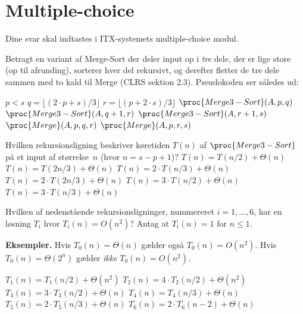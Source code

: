 \section*{Multiple-choice}\label{sec:mc}

Dine svar skal indtastes i ITX-systemets multiple-choice modul.

\multiplechoicestart


Betragt en variant af {\sc Merge-Sort} der deler input op i \emph{tre} dele, der er lige store (op til afrunding), sorterer hver del rekursivt, og derefter fletter de tre dele sammen med to kald til {\sc Merge} (CLRS sektion 2.3). Pseudokoden ser således ud:
\begin{codebox}
  \li \If $p<s$ \Do
  \li $q = \lfloor (2\cdot p+ s)/3\rfloor$
  \li $r = \lfloor (p+2\cdot s)/3\rfloor$
  \li $\proc{Merge3-Sort}(A, p, q)$
  \li $\proc{Merge3-Sort}(A, q+1, r)$
  \li $\proc{Merge3-Sort}(A, r+1, s)$
  \li $\proc{Merge}(A, p, q, r)$
  \li $\proc{Merge}(A, p, r, s)$ \End
\end{codebox}

\noindent
Hvilken rekursionsligning beskriver køretiden $T(n)$ af $\proc{Merge3-Sort}$ på et input af størrelse~$n$ (hvor $n = s - p + 1$)?
\etsvar
\mulighederstart
\svar $T(n) = T(n/2) + \Theta(n)$
\svar $T(n) = T(2n/3) + \Theta(n)$
\svar $T(n) = 2\cdot T(n/3) + \Theta(n)$
\svar $T(n) = 2\cdot T(2n/3) + \Theta(n)$
\svar $T(n) = 3\cdot T(n/2) + \Theta(n)$
\svar $T(n) = 3\cdot T(n/3) + \Theta(n)$ \korrekt
\mulighederslut





Hvilken af nedenstående rekursionsligninger, nummereret $i=1,\dots,6$, har en løsning $T_i$ hvor $T_i(n) = O(n^2)$?
Antag at $T_i(n) = 1$ for $n\leq 1$. \fleresvar

\medskip\noindent
{\bf Eksempler.} Hvis $T_0(n) = \Theta(n)$ gælder også $T_0(n) = O(n^2)$. Hvis $T_0(n) = \Theta(2^n)$ gælder \emph{ikke} $T_0(n) = O(n^2)$.

\mulighederstart
\svar $T_1(n) = T_1(n/2) + \Theta(n^2)$ \korrekt
\svar $T_2(n) = 4\cdot T_2(n/2) + \Theta(n^2)$
\svar $T_3(n) = 3\cdot T_3(n/2) + \Theta(n)$  \korrekt
\svar $T_4(n) = T_4(n/3) + \Theta(n)$ \korrekt
\svar $T_5(n) = 2\cdot T_5(n/3) + \Theta(n)$ \korrekt
\svar $T_6(n) = 2\cdot T_6(n-2) + \Theta(n)$
\mulighederslut

